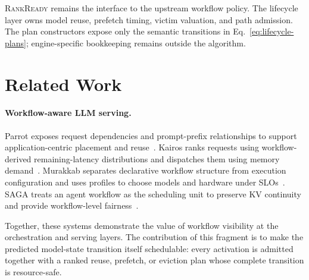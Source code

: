 \documentclass{article}
\begin{document}
\textsc{RankReady} remains the interface to the upstream workflow policy.
The lifecycle layer owns model reuse, prefetch timing, victim valuation, and
path admission. The plan constructors expose only the semantic transitions in
Eq.~\ref{eq:lifecycle-plans}; engine-specific bookkeeping remains outside the
algorithm.

\section{Related Work}

\paragraph{Workflow-aware LLM serving.} Parrot exposes request dependencies and
prompt-prefix relationships to support
application-centric placement and reuse~\cite{lin2024parrot}. Kairos ranks
requests using workflow-derived remaining-latency distributions and dispatches
them using memory demand~\cite{chen2025kairos}. Murakkab separates declarative
workflow structure from execution configuration and uses profiles to choose
models and hardware under SLOs~\cite{chaudhry2025murakkab}. SAGA treats an agent
workflow as the scheduling unit to preserve KV continuity and provide
workflow-level fairness~\cite{guo2026saga}.

Together, these systems demonstrate the value of workflow visibility at the
orchestration and serving layers. The contribution of this fragment is to make
the predicted model-state transition itself schedulable: every activation is
admitted together with a ranked reuse, prefetch, or eviction plan whose complete
transition is resource-safe.



\end{document}
